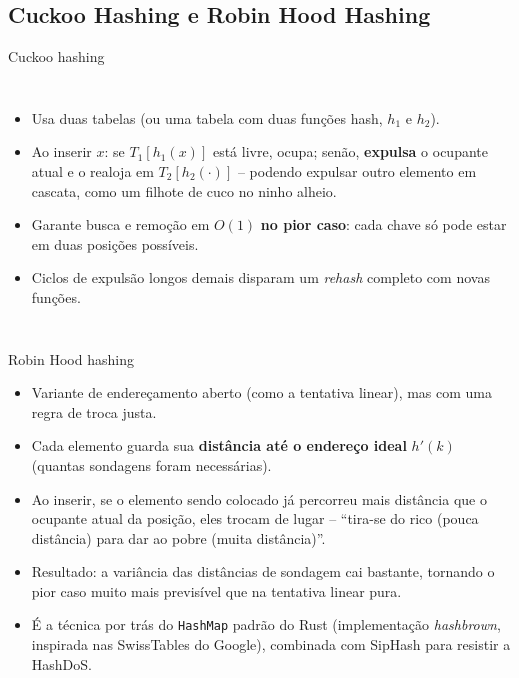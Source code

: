 \documentclass{beamer}
\begin{document}
\subsection{Cuckoo Hashing e Robin Hood Hashing}
\begin{frame}{Cuckoo hashing}
  \begin{columns}[T]
    \begin{itemize}
      \item Usa duas tabelas (ou uma tabela com duas funções hash, $h_1$ e $h_2$).
      \item Ao inserir $x$: se $T_1[h_1(x)]$ está livre, ocupa; senão, \textbf{expulsa} o ocupante atual e o realoja em $T_2[h_2(\cdot)]$ -- podendo expulsar outro elemento em cascata, como um filhote de cuco no ninho alheio.
      \item Garante busca e remoção em $O(1)$ \textbf{no pior caso}: cada chave só pode estar em duas posições possíveis.
      \item Ciclos de expulsão longos demais disparam um \emph{rehash} completo com novas funções.
    \end{itemize}
    \centering\scriptsize
  \end{columns}
\end{frame}

\begin{frame}{Robin Hood hashing}
  \begin{itemize}
    \item Variante de endereçamento aberto (como a tentativa linear), mas com uma regra de troca justa.
    \item Cada elemento guarda sua \textbf{distância até o endereço ideal} $h'(k)$ (quantas sondagens foram necessárias).
    \item Ao inserir, se o elemento sendo colocado já percorreu mais distância que o ocupante atual da posição, eles trocam de lugar -- ``tira-se do rico (pouca distância) para dar ao pobre (muita distância)''.
    \item Resultado: a variância das distâncias de sondagem cai bastante, tornando o pior caso muito mais previsível que na tentativa linear pura.
    \item É a técnica por trás do \texttt{HashMap} padrão do Rust (implementação \emph{hashbrown}, inspirada nas SwissTables do Google), combinada com SipHash para resistir a HashDoS.
  \end{itemize}
\end{frame}
\end{document}
